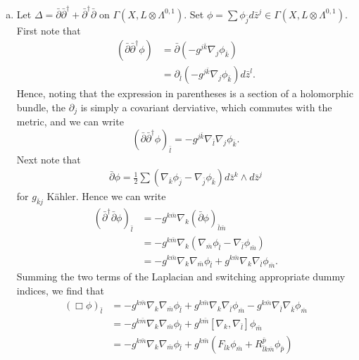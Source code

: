 \documentclass{../mathnotes}
\begin{document}
\begin{enumerate}[(a)]
    \item Let $\Delta=\bar\partial\bar\partial^\dagger+\bar\partial^\dagger\bar\partial$ on $\Gamma(X,L\otimes\Lambda^{0,1})$.
        Set $\phi=\sum \phi_{\bar j}d\bar z^j\in\Gamma(X,L\otimes\Lambda^{0,1})$.
        First note that
        \begin{align*}
            \left( \bar\partial\bar\partial^{\dagger}\phi \right)&=\bar\partial\left( -g^{j\bar k}\nabla_j\phi_{\bar k} \right)\\
            &=\partial_{\bar l}\left( -g^{j\bar k}\nabla_j\phi_{\bar k} \right)d\bar z^l.
        \end{align*}
        Hence, noting that the expression in parentheses is a section of a holomorphic bundle, the $\partial_j$ is simply a covariant derviative, which
        commutes with the metric, and we can write
        \[\left( \bar\partial\bar\partial^{\dagger}\phi \right)_{\bar l}=-g^{j\bar k}\nabla_{\bar l}\nabla_{j}\phi_{\bar k}.\]
        Next note that
        \begin{align*}
            \bar\partial\phi=\frac{1}{2}\sum\left( \nabla_{\bar k}\phi_{\bar j}-\nabla_{\bar j}\phi_{\bar k} \right)d\bar z^k\wedge d\bar z^j
        \end{align*}
        for $g_{\bar kj}$ K\"ahler. Hence we can write
        \begin{align*}
            \left( \bar\partial^\dagger\bar\partial\phi \right)_{\bar l}&=-g^{k\bar m}\nabla_{k}(\bar\partial\phi)_{\bar l\bar m}\\
            &=-g^{k\bar m}\nabla_k\left( \nabla_{\bar m}\phi_{\bar l}-\nabla_{\bar l}\phi_{\bar m} \right)\\
            &=-g^{k\bar m}\nabla_k\nabla_{\bar m}\phi_{\bar l}+g^{k\bar m}\nabla_k\nabla_{\bar l}\phi_{\bar m}.
        \end{align*}
        Summing the two terms of the Laplacian and switching appropriate dummy indices, we find that
        \begin{align*}
            (\Box\phi)_{\bar l}&=-g^{k\bar m}\nabla_k\nabla_{\bar m}\phi_{\bar l}+g^{k\bar m}\nabla_k\nabla_{\bar l}\phi_{\bar m}-g^{k\bar m}\nabla_{\bar l}\nabla_{\bar k}\phi_{\bar m}\\
            &=-g^{k\bar m}\nabla_k\nabla_{\bar m}\phi_{\bar l}+g^{k\bar m}[\nabla_k,\nabla_{\bar l}]\phi_{\bar m}\\
            &=-g^{k\bar m}\nabla_k\nabla_{\bar m}\phi_{\bar l}+g^{k\bar m}\left( F_{\bar lk}\phi_{\bar m}+R_{\bar lk\bar m}^{\bar p}\phi_{\bar p} \right)\\

\end{align*}
\end{enumerate}
\end{document}
